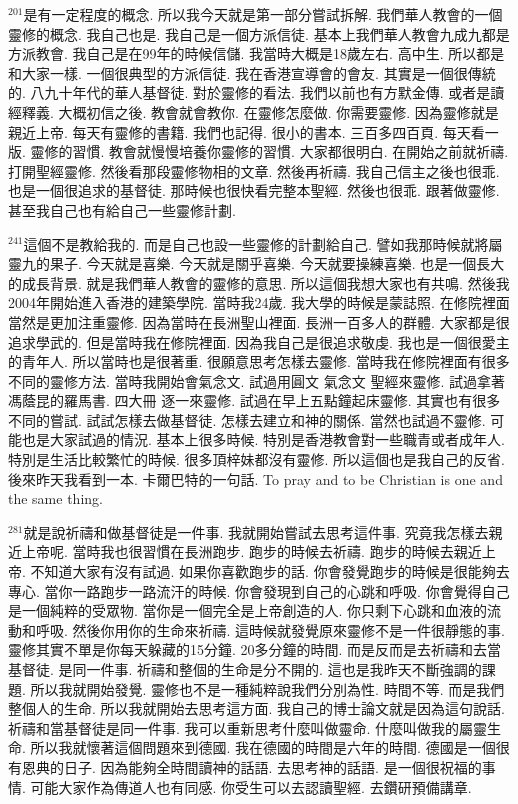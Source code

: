 \documentclass{book}
\begin{document}
$^{201}$是有一定程度的概念.
所以我今天就是第一部分嘗試拆解.
我們華人教會的一個靈修的概念.
我自己也是.
我自己是一個方派信徒.
基本上我們華人教會九成九都是方派教會.
我自己是在99年的時候信儲.
我當時大概是18歲左右.
高中生.
所以都是和大家一樣.
一個很典型的方派信徒.
我在香港宣導會的會友.
其實是一個很傳統的.
八九十年代的華人基督徒.
對於靈修的看法.
我們以前也有方默金傳.
或者是讀經釋義.
大概初信之後.
教會就會教你.
在靈修怎麼做.
你需要靈修.
因為靈修就是親近上帝.
每天有靈修的書籍.
我們也記得.
很小的書本.
三百多四百頁.
每天看一版.
靈修的習慣.
教會就慢慢培養你靈修的習慣.
大家都很明白.
在開始之前就祈禱.
打開聖經靈修.
然後看那段靈修物相的文章.
然後再祈禱.
我自己信主之後也很乖.
也是一個很追求的基督徒.
那時候也很快看完整本聖經.
然後也很乖.
跟著做靈修.
甚至我自己也有給自己一些靈修計劃.

$^{241}$這個不是教給我的.
而是自己也設一些靈修的計劃給自己.
譬如我那時候就將屬靈九的果子.
今天就是喜樂.
今天就是關乎喜樂.
今天就要操練喜樂.
也是一個長大的成長背景.
就是我們華人教會的靈修的意思.
所以這個我想大家也有共鳴.
然後我2004年開始進入香港的建築學院.
當時我24歲.
我大學的時候是蒙誌照.
在修院裡面當然是更加注重靈修.
因為當時在長洲聖山裡面.
長洲一百多人的群體.
大家都是很追求學武的.
但是當時我在修院裡面.
因為我自己是很追求敬虔.
我也是一個很愛主的青年人.
所以當時也是很著重.
很願意思考怎樣去靈修.
當時我在修院裡面有很多不同的靈修方法.
當時我開始會氣念文.
試過用圓文 氣念文 聖經來靈修.
試過拿著馮蔭昆的羅馬書.
四大冊 逐一來靈修.
試過在早上五點鐘起床靈修.
其實也有很多不同的嘗試.
試試怎樣去做基督徒.
怎樣去建立和神的關係.
當然也試過不靈修.
可能也是大家試過的情況.
基本上很多時候.
特別是香港教會對一些職青或者成年人.
特別是生活比較繁忙的時候.
很多頂梓妹都沒有靈修.
所以這個也是我自己的反省.
後來昨天我看到一本.
卡爾巴特的一句話.
To pray and to be Christian is one and the same thing.

$^{281}$就是說祈禱和做基督徒是一件事.
我就開始嘗試去思考這件事.
究竟我怎樣去親近上帝呢.
當時我也很習慣在長洲跑步.
跑步的時候去祈禱.
跑步的時候去親近上帝.
不知道大家有沒有試過.
如果你喜歡跑步的話.
你會發覺跑步的時候是很能夠去專心.
當你一路跑步一路流汗的時候.
你會發現到自己的心跳和呼吸.
你會覺得自己是一個純粹的受眾物.
當你是一個完全是上帝創造的人.
你只剩下心跳和血液的流動和呼吸.
然後你用你的生命來祈禱.
這時候就發覺原來靈修不是一件很靜態的事.
靈修其實不單是你每天躲藏的15分鐘.
20多分鐘的時間.
而是反而是去祈禱和去當基督徒.
是同一件事.
祈禱和整個的生命是分不開的.
這也是我昨天不斷強調的課題.
所以我就開始發覺.
靈修也不是一種純粹說我們分別為性.
時間不等.
而是我們整個人的生命.
所以我就開始去思考這方面.
我自己的博士論文就是因為這句說話.
祈禱和當基督徒是同一件事.
我可以重新思考什麼叫做靈命.
什麼叫做我的屬靈生命.
所以我就懷著這個問題來到德國.
我在德國的時間是六年的時間.
德國是一個很有恩典的日子.
因為能夠全時間讀神的話語.
去思考神的話語.
是一個很祝福的事情.
可能大家作為傳道人也有同感.
你受生可以去認讀聖經.
去鑽研預備講章.
\end{document}
